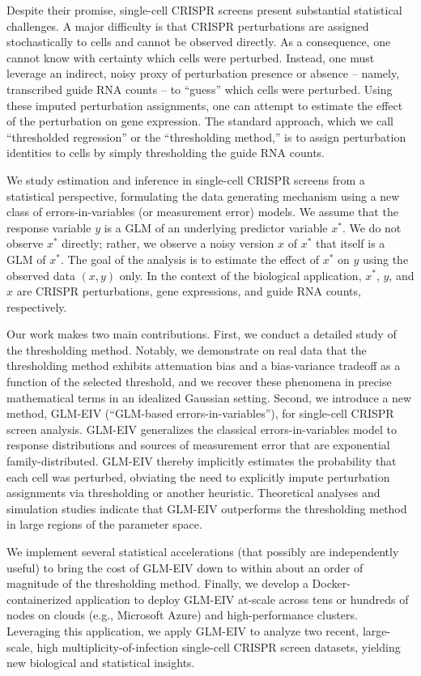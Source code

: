 \documentclass[12pt]{article}
\begin{document}
Despite their promise, single-cell CRISPR screens present substantial statistical challenges. A major difficulty is that CRISPR perturbations are assigned stochastically to cells and cannot be observed directly. As a consequence, one cannot know with certainty which cells were perturbed. Instead, one must leverage an indirect, noisy proxy of perturbation presence or absence -- namely, transcribed guide RNA counts -- to ``guess'' which cells were perturbed. Using these imputed perturbation assignments, one can attempt to estimate the effect of the perturbation on gene expression. The standard approach, which we call ``thresholded regression'' or the ``thresholding method,'' is to assign perturbation identities to cells by simply thresholding the guide RNA counts.

We study estimation and inference in single-cell CRISPR screens from a statistical perspective, formulating the data generating mechanism using a new class of errors-in-variables (or measurement error) models. We assume that the response variable $y$ is a GLM of an underlying predictor variable $x^*$. We do not observe $x^*$ directly; rather, we observe a noisy version $x$ of $x^*$ that itself is a GLM of $x^*$. The goal of the analysis is to estimate the effect of $x^*$ on $y$ using the observed data $(x , y)$ only. In the context of the biological application, $x^*$, $y$, and $x$ are CRISPR perturbations, gene expressions, and guide RNA counts, respectively.

Our work makes two main contributions. First, we conduct a detailed study of the thresholding method. Notably, we demonstrate on real data that the thresholding method exhibits attenuation bias and a bias-variance tradeoff as a function of the selected threshold, and we recover these phenomena in precise mathematical terms in an idealized Gaussian setting. Second, we introduce a new method, GLM-EIV (``GLM-based errors-in-variables''), for single-cell CRISPR screen analysis. GLM-EIV generalizes the classical errors-in-variables model to response distributions and sources of measurement error that are exponential family-distributed. GLM-EIV thereby implicitly estimates the probability that each cell was perturbed, obviating the need to explicitly impute perturbation assignments via thresholding or another heuristic. Theoretical analyses and simulation studies indicate that GLM-EIV outperforms the thresholding method in large regions of the parameter space.

We implement several statistical accelerations (that possibly are independently useful) to bring the cost of GLM-EIV down to within about an order of magnitude of the thresholding method. Finally, we develop a Docker-containerized application to deploy GLM-EIV at-scale across tens or hundreds of nodes on clouds (e.g., Microsoft Azure) and high-performance clusters. Leveraging this application, we apply GLM-EIV to analyze two recent, large-scale, high multiplicity-of-infection single-cell CRISPR screen datasets, yielding new biological and statistical insights.
\end{document}
